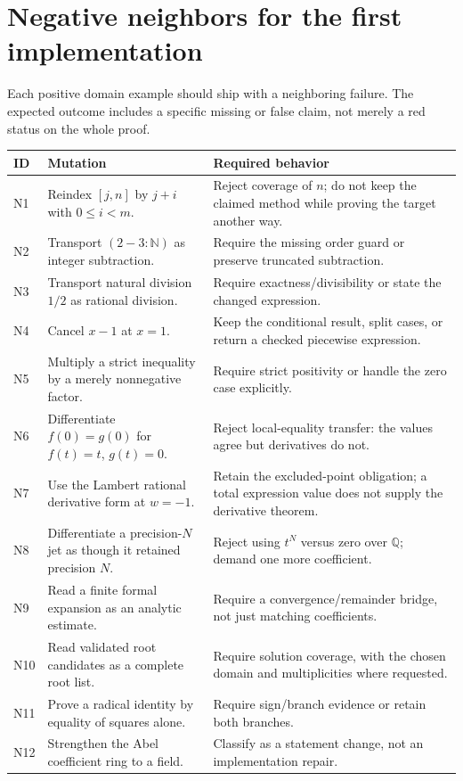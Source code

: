 \documentclass[11pt,a4paper]{article}
\newcommand{\N}{\mathbb N}
\newcommand{\Q}{\mathbb Q}
\theoremstyle{definition}
\theoremstyle{remark}
\begin{document}
\section{Negative neighbors for the first implementation}\label{app:negative}
Each positive domain example should ship with a neighboring failure. The expected outcome includes a specific missing or false claim, not merely a red status on the whole proof.
\begin{longtable}{@{}P{.06\textwidth}P{.43\textwidth}P{.43\textwidth}@{}}
\toprule
ID & Mutation & Required behavior\\
\midrule
\endhead
N1 & Reindex $[j,n]$ by $j+i$ with $0\le i<m$. & Reject coverage of $n$; do not keep the claimed method while proving the target another way.\\
N2 & Transport $(2-3:\N)$ as integer subtraction. & Require the missing order guard or preserve truncated subtraction.\\
N3 & Transport natural division $1/2$ as rational division. & Require exactness/divisibility or state the changed expression.\\
N4 & Cancel $x-1$ at $x=1$. & Keep the conditional result, split cases, or return a checked piecewise expression.\\
N5 & Multiply a strict inequality by a merely nonnegative factor. & Require strict positivity or handle the zero case explicitly.\\
N6 & Differentiate $f(0)=g(0)$ for $f(t)=t$, $g(t)=0$. & Reject local-equality transfer: the values agree but derivatives do not.\\
N7 & Use the Lambert rational derivative form at $w=-1$. & Retain the excluded-point obligation; a total expression value does not supply the derivative theorem.\\
N8 & Differentiate a precision-$N$ jet as though it retained precision $N$. & Reject using $t^N$ versus zero over $\Q$; demand one more coefficient.\\
N9 & Read a finite formal expansion as an analytic estimate. & Require a convergence/remainder bridge, not just matching coefficients.\\
N10 & Read validated root candidates as a complete root list. & Require solution coverage, with the chosen domain and multiplicities where requested.\\
N11 & Prove a radical identity by equality of squares alone. & Require sign/branch evidence or retain both branches.\\
N12 & Strengthen the Abel coefficient ring to a field. & Classify as a statement change, not an implementation repair.\\

\end{longtable}
\end{document}

